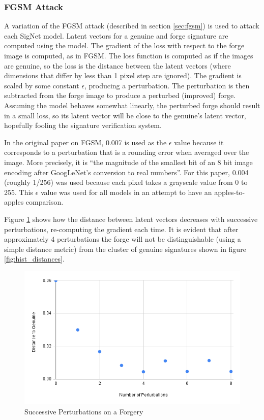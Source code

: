 \subsubsection{FGSM Attack}\label{sec:my_fgsm}
A variation of the FGSM attack (described in section \ref{sec:fgsm}) is used to attack each SigNet model.
Latent vectors for a genuine and forge signature are computed using the model.
The gradient of the loss with respect to the forge image is computed, as in FGSM.
The loss function is computed as if the images are genuine, so the loss is the distance between the latent vectors (where dimensions that differ by less than 1 pixel step are ignored).
The gradient is scaled by some constant $\epsilon$, producing a perturbation.
The perturbation is then subtracted from the forge image to produce a perturbed (improved) forge.
Assuming the model behaves somewhat linearly, the perturbed forge should result in a small loss, so its latent vector will be close to the genuine's latent vector, hopefully fooling the signature verification system.

In the original paper on FGSM, 0.007 is used as the $\epsilon$ value because it corresponds to a perturbation that is a rounding error when averaged over the image.
More precisely, it is ``the magnitude of the smallest bit of an 8 bit image encoding after GoogLeNet's conversion to real numbers''\cite{goodfellow}.
For this paper, 0.004 (roughly 1/256) was used because each pixel takes a grayscale value from 0 to 255.
This $\epsilon$ value was used for all models in an attempt to have an apples-to-apples comparison.

Figure \ref{fig:dist_vs_perts} shows how the distance between latent vectors decreases with successive perturbations, re-computing the gradient each time.
It is evident that after approximately 4 perturbations the forge will not be distinguishable (using a simple distance metric) from the cluster of genuine signatures shown in figure \ref{fig:hist_distances}.
\begin{figure}[h]
    \begin{center}
        \includegraphics[width=0.8\linewidth]{dist_pert_plot.png}
    \end{center}
    \caption{Successive Perturbations on a Forgery}
    \label{fig:dist_vs_perts}
\end{figure}


